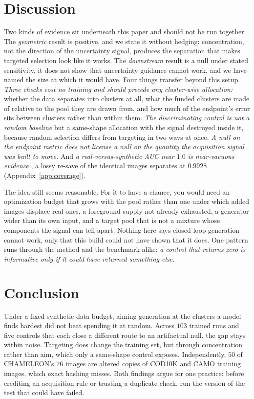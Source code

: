 \documentclass{article}
\begin{document}
\section{Discussion}
\label{sec:discussion}
Two kinds of evidence sit underneath this paper and should not be run together. The
\emph{geometric} result is positive, and we state it without hedging: concentration, not the
direction of the uncertainty signal, produces the separation that makes targeted selection look like it works. The \emph{downstream} result is a null under stated sensitivity, it does not show that uncertainty guidance cannot work, and we have named the size at which it would have. Four things transfer beyond this setup. \textit{Three checks cost no training and should precede any
cluster-wise allocation:} whether the data separates into clusters at all, what the funded clusters
are made of relative to the pool they are drawn from, and how much of the endpoint's error sits
between clusters rather than within them. \textit{The discriminating control is not a random
baseline} but a same-shape allocation with the signal destroyed inside it, because random selection
differs from targeting in two ways at once. \textit{A null on the endpoint metric does not license a
null on the quantity the acquisition signal was built to move.} And \textit{a real-versus-synthetic AUC near $1.0$ is near-vacuous evidence} ,  a lossy re-save of the identical images separates at
$0.9928$ (Appendix~\ref{app:coverage}).

The idea still seems reasonable. For it to have a chance, you would need an optimization budget that
grows with the pool rather than one under which added images displace real ones, a foreground supply
not already exhausted, a generator wider than its own input, and a target pool that is not a mixture
whose components the signal can tell apart. Nothing here says closed-loop generation cannot work,
only that this build could not have shown that it does. One pattern runs through the method and the
benchmark alike: \textit{a control that returns zero is informative only if it could have returned
something else.}


\section{Conclusion}
\label{sec:conclusion}
Under a fixed synthetic-data budget, aiming generation at the clusters a model finds hardest did not beat spending it at random. Across $103$ trained runs and five controls that each close a different
route to an artifactual null, the gap stays within noise. Targeting does change the training set,
but through concentration rather than aim, which only a same-shape control exposes. Independently,
$50$ of CHAMELEON's $76$ images are altered copies of COD10K and CAMO training images, which exact
hashing misses. Both findings argue for one practice: before crediting an acquisition rule or
trusting a duplicate check, run the version of the test that could have failed.
\end{document}
